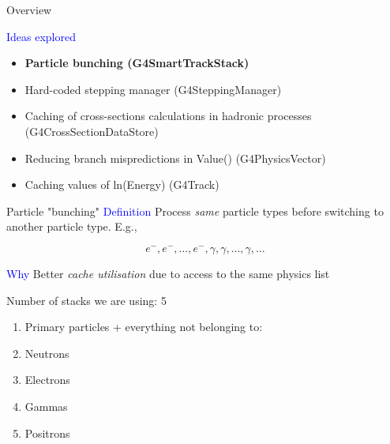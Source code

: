 \documentclass{beamer}
\begin{document}
\begin{frame}{Overview}

\textcolor{blue}{Ideas explored}
\begin{itemize}
  \item {\bf Particle bunching (G4SmartTrackStack) }
  \item Hard-coded stepping manager (G4SteppingManager)
  \item Caching of cross-sections calculations in hadronic processes (G4CrossSectionDataStore)
  \item Reducing branch mispredictions in Value() (G4PhysicsVector)
  \item Caching values of ln(Energy) (G4Track)
\end{itemize}
\end{frame}

\begin{frame}{Particle "bunching"}
\textcolor{blue}{Definition}
Process \textit{same} particle types before switching to another particle type. E.g.,

\begin{equation*}
e^-, e^-, \ldots, e^-, \gamma, \gamma, \ldots, \gamma, \ldots
\end{equation*}

\textcolor{blue}{Why} Better \textit{cache utilisation} due to access to the
same physics list

\vspace{5 mm}

Number of stacks we are using: 5

\begin{enumerate}
\item Primary particles + everything not belonging to:
\item Neutrons
\item Electrons
\item Gammas
\item Positrons
\end{enumerate}
\end{frame}
\end{document}
